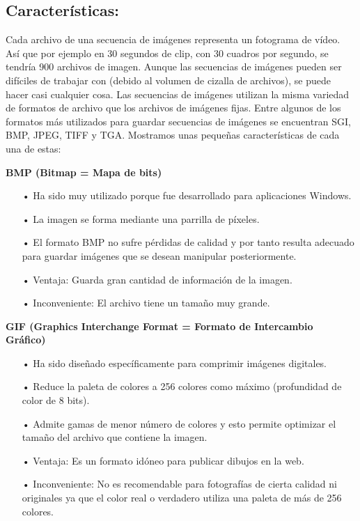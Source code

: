 \subsection{Características:}
Cada archivo de una secuencia de imágenes representa un fotograma de vídeo. Así que por ejemplo en 30 segundos de clip, con 30 cuadros por segundo, se tendría 900 archivos de imagen. Aunque las secuencias de imágenes pueden ser difíciles de trabajar con (debido al volumen de cizalla de archivos), se puede hacer casi cualquier cosa.
\vskip 0.1cm
Las secuencias de imágenes utilizan la misma variedad de formatos de archivo que los archivos de imágenes fijas. Entre algunos de los formatos más utilizados para guardar secuencias de imágenes se encuentran SGI, BMP, JPEG, TIFF y TGA. Mostramos unas pequeñas características de cada una de estas:
\vskip 0.1cm

{\bf BMP (Bitmap = Mapa de bits)} \vskip 0.1cm

\begin{itemize}
\item[•] Ha sido muy utilizado porque fue desarrollado para aplicaciones Windows.
\item[•] La imagen se forma mediante una parrilla de píxeles.
\item[•] El formato BMP no sufre pérdidas de calidad y por tanto resulta adecuado para guardar imágenes que se desean manipular posteriormente.
\item[•] Ventaja: Guarda gran cantidad de información de la imagen. 
\item[•] Inconveniente: El archivo tiene un tamaño muy grande.
\end{itemize}

{\bf GIF (Graphics Interchange Format = Formato de Intercambio Gráfico)} \vskip 0.1cm

\begin{itemize}
\item[•] Ha sido diseñado específicamente para comprimir imágenes digitales.
\item[•] Reduce la paleta de colores a 256 colores como máximo (profundidad de color de 8 bits).
\item[•] Admite gamas de menor número de colores y esto permite optimizar el tamaño del archivo que contiene la imagen.
\item[•] Ventaja: Es un formato idóneo para publicar dibujos en la web.
\item[•] Inconveniente: No es recomendable para fotografías de cierta calidad ni originales ya que el color real o verdadero utiliza una paleta de más de 256 colores.
\end{itemize}

